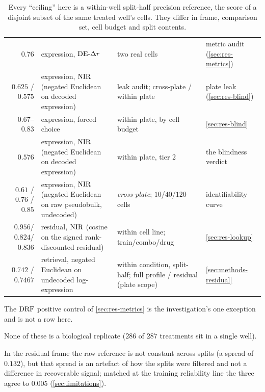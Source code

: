 \begin{table}[htbp]
\caption{ Every ``ceiling'' here is a
within-well split-half precision reference, the score of a disjoint subset of
the same treated well's cells. They differ in frame, comparison set, cell budget
and split contents.}
\label{tab:ceilings}
\begin{fullwidth}
\begin{threeparttable}
\begin{tabularx}{\linewidth}{@{}r L{61mm} L{48mm} Y@{}}
 &  & 
  &  \\
\midrule
$0.76$ & expression, $\textrm{DE-}\Delta r$ & two real cells & metric audit
  (\cref{sec:res-metrics}) \\
\addlinespace
$0.625$ / $0.575$ & expression, $\textrm{NIR}$ (negated Euclidean on decoded expression)
  & leak audit; cross-plate / within plate
  & plate leak (\cref{sec:res-blind}) \\
\addlinespace
$0.67$--$0.83$ & expression, forced choice & within plate, by cell budget
  & \cref{sec:res-blind} \\
\addlinespace
$0.576$ & expression, $\textrm{NIR}$ (negated Euclidean on decoded expression)
  & within plate, tier 2 & the blindness verdict \\
\addlinespace
$0.61$ / $0.76$ / $0.85$ & expression, $\textrm{NIR}$ (negated Euclidean on raw
  pseudobulk, undecoded) & \emph{cross-plate};
  $10$/$40$/$120$ cells & identifiability curve \\
\addlinespace
$0.956$/$0.824$/$0.836$ & residual, $\textrm{NIR}$ (cosine on the signed rank-discounted
  residual) & within cell line;
  train/combo/drug & \cref{sec:res-lookup} \\
\addlinespace
$0.742$ / $0.7467$ & retrieval, negated Euclidean on undecoded log-expression & within condition, split-half; full profile / residual (plate scope) & \cref{sec:methods-residual} \\
\end{tabularx}
\begin{tablenotes}[flushleft]
\item The $\textrm{DRF}$ positive control of \cref{sec:res-metrics} is the
investigation's one exception and is not a row here.
\item None of these is a biological replicate ($286$ of $287$ treatments sit in
a single well).
\item In the residual frame the raw reference is not constant across splits (a
spread of $0.132$), but that spread is an artefact of how the splits were
filtered and not a difference in recoverable signal; matched at the training
reliability line the three agree to $0.005$ (\cref{sec:limitations}).
\end{tablenotes}
\end{threeparttable}
\end{fullwidth}
\end{table}

